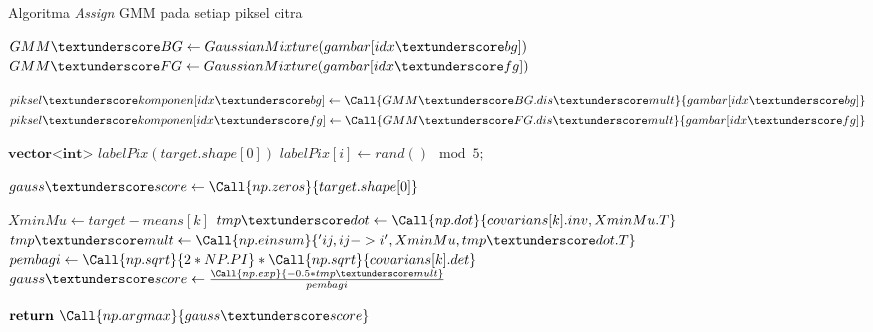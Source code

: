 \begin{algorithm}                     
    \caption{Algoritma \emph{Assign} GMM pada setiap piksel citra}          
    \label{algo:assign_GMM}                          
    \begin{algorithmic}                    %




        \State $GMM\textunderscore BG \gets GaussianMixture(gambar[idx\textunderscore bg])$
        \State $GMM\textunderscore FG \gets GaussianMixture(gambar[idx\textunderscore fg])$

        \State $piksel\textunderscore komponen[idx\textunderscore bg] \gets \Call{GMM\textunderscore BG.dis\textunderscore mult}{gambar[idx\textunderscore bg]}$
        \State $piksel\textunderscore komponen[idx\textunderscore fg] \gets \Call{GMM\textunderscore FG.dis\textunderscore mult}{gambar[idx\textunderscore fg]}$
    \EndFunction

        \State $\textbf{vector<int> } labelPix(target.shape[0])$
            \State $labelPix[i] \gets rand() \mod 5;$
        \EndFor
    \EndFunction

     
        \State $gauss\textunderscore score \gets  \Call{np.zeros}{target.shape[0]}$
        
                \State $XminMu \gets target - means[k]$
                \State $tmp\textunderscore dot \gets \Call{np.dot}{covarians[k].inv, XminMu.T}$
                \State $tmp\textunderscore mult \gets \Call{np.einsum}{'ij,ij->i', XminMu, tmp\textunderscore dot.T}$
                \State $pembagi \gets \Call{np.sqrt}{2* NP.PI} * \Call{np.sqrt}{covarians[k].det}$
                \State $gauss\textunderscore score \gets \frac{\Call{np.exp}{-0.5 * tmp\textunderscore mult}}{pembagi}$
            \EndIf
        \EndFor

        \State $\textbf{return } \Call{np.argmax}{gauss\textunderscore score}$
    \EndFunction
    \end{algorithmic}
\end{algorithm}
